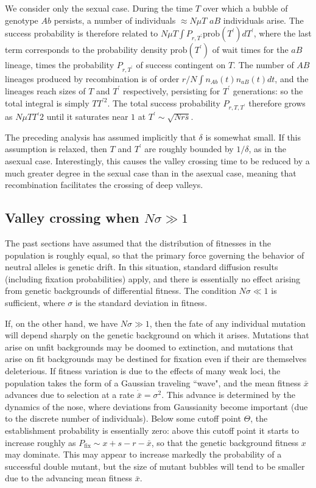\documentclass[10pt]{revtex4}
\begin{document}
We consider only the sexual case.
During the time $T$ over which a bubble of genotype $Ab$ persists, a number of individuals $\approx N\mu T$ $aB$ individuals arise.
The success probability is therefore related to $N\mu T \int P_{r,T^\prime} \mathrm{prob} (T^\prime) dT^\prime$, where the last term corresponds to the probability density $\mathrm{prob}(T^\prime)$ of wait times for the $aB$ lineage, times the probability $P_{r,T^\prime}$ of success contingent on $T$.
The number of $AB$ lineages produced by recombination is of order $r/N \int n_{Ab}(t) n_{aB}(t) dt$, and the lineages reach sizes of $T$ and $T^\prime$ respectively, persisting for $T^\prime$ generations: so the total integral is simply $TT^{\prime 2}$.
The total success probability $P_{r,T,T^\prime}$ therefore grows as $N\mu TT{^\prime 2}$ until it saturates near $1$ at $T^\prime \sim \sqrt{Nr\bar{s}}$.

The preceding analysis has assumed implicitly that $\delta$ is somewhat small.
If this assumption is relaxed, then $T$ and $T^\prime$ are roughly bounded by $1/\delta$, as in the asexual case.
Interestingly, this causes the valley crossing time to be reduced by a much greater degree in the sexual case than in the asexual case, meaning that recombination facilitates the crossing of deep valleys.

\subsection{Valley crossing when $N\sigma \gg 1$}

The past sections have assumed that the distribution of fitnesses in the population is roughly equal, so that the primary force governing the behavior of neutral alleles is genetic drift.
In this situation, standard diffusion results (including fixation probabilities) apply, and there is essentially no effect arising from genetic backgrounds of differential fitness.
The condition $N\sigma \ll 1$ is sufficient, where $\sigma$ is the standard deviation in fitness.

If, on the other hand, we have $N\sigma \gg 1$, then the fate of any individual mutation will depend sharply on the genetic background on which it arises.
Mutations that arise on unfit backgrounds may be doomed to extinction, and mutations that arise on fit backgrounds may be destined for fixation even if their are themselves deleterious.
If fitness variation is due to the effects of many weak loci, the population takes the form of a Gaussian traveling ``wave", and the mean fitness $\bar{x}$ advances due to selection at a rate $\dot{\bar{x}} = \sigma^2$.
This advance is determined by the dynamics of the nose, where deviations from Gaussianity become important (due to the discrete number of individuals).
Below some cutoff point $\Theta$, the establishment probability is essentially zero: above this cutoff point it starts to increase roughly as $P_\mathrm{fix} \sim x+s-r-\bar{x}$, so that the genetic background fitness $x$ may dominate. This may appear to increase markedly the probability of a successful double mutant, but the size of mutant bubbles will tend to be smaller due to the advancing mean fitness $\bar{x}$.
\end{document}
